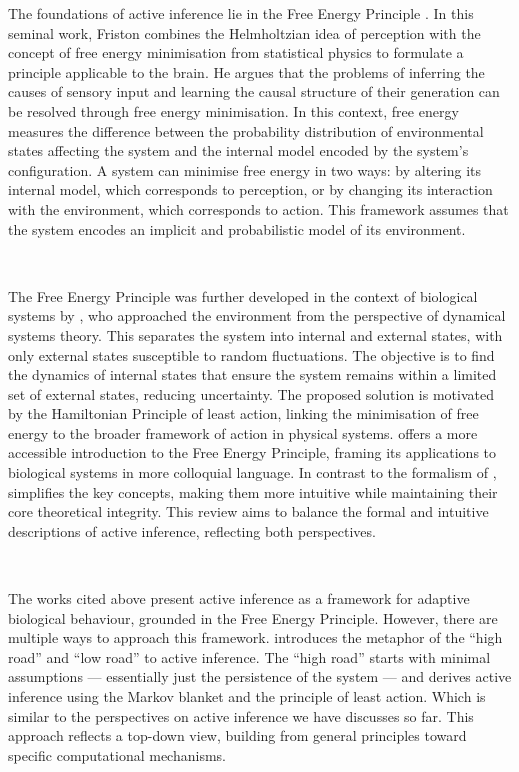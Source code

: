 \documentclass{article}
\begin{document}
The foundations of active inference lie in the Free Energy Principle \citep{friston2006free}. In this seminal work, Friston combines the Helmholtzian idea of perception with the concept of free energy minimisation from statistical physics to formulate a principle applicable to the brain. He argues that the problems of inferring the causes of sensory input and learning the causal structure of their generation can be resolved through free energy minimisation. In this context, free energy measures the difference between the probability distribution of environmental states affecting the system and the internal model encoded by the system's configuration. A system can minimise free energy in two ways: by altering its internal model, which corresponds to perception, or by changing its interaction with the environment, which corresponds to action. This framework assumes that the system encodes an implicit and probabilistic model of its environment.

\

The Free Energy Principle was further developed in the context of biological systems by \citet{friston2012free}, who approached the environment from the perspective of dynamical systems theory. This separates the system into internal and external states, with only external states susceptible to random fluctuations. The objective is to find the dynamics of internal states that ensure the system remains within a limited set of external states, reducing uncertainty. The proposed solution is motivated by the Hamiltonian Principle of least action, linking the minimisation of free energy to the broader framework of action in physical systems. \citet{millidge2019combining} offers a more accessible introduction to the Free Energy Principle, framing its applications to biological systems in more colloquial language. In contrast to the formalism of \citet{friston2012active}, \citet{millidge2019combining} simplifies the key concepts, making them more intuitive while maintaining their core theoretical integrity. This review aims to balance the formal and intuitive descriptions of active inference, reflecting both perspectives.

\

The works cited above present active inference as a framework for adaptive biological behaviour, grounded in the Free Energy Principle. However, there are multiple ways to approach this framework. \citet{parr2022ActiveInference} introduces the metaphor of the ``high road'' and ``low road'' to active inference. The ``high road'' starts with minimal assumptions — essentially just the persistence of the system — and derives active inference using the Markov blanket and the principle of least action. Which is similar to the perspectives on active inference we have discusses so far. This approach reflects a top-down view, building from general principles toward specific computational mechanisms.
\end{document}
